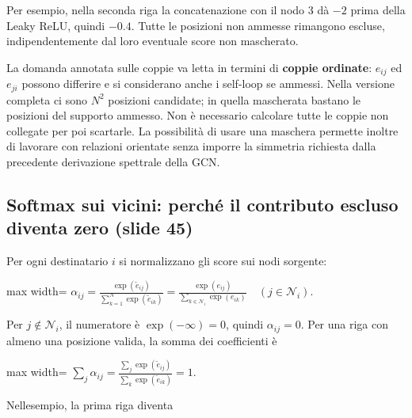 \documentclass[11pt,a4paper,oneside,openany]{book}
\begin{document}
Per esempio, nella seconda riga la concatenazione con il nodo 3 dà \(-2\) prima della Leaky ReLU, quindi \(-0.4\). Tutte le posizioni non ammesse rimangono escluse, indipendentemente dal loro eventuale score non mascherato.

La domanda annotata sulle coppie va letta in termini di \textbf{coppie ordinate}: \(e_{ij}\) ed \(e_{ji}\) possono differire e si considerano anche i self-loop se ammessi. Nella versione completa ci sono \(N^2\) posizioni candidate; in quella mascherata bastano le posizioni del supporto ammesso. Non è necessario calcolare tutte le coppie non collegate per poi scartarle. La possibilità di usare una maschera permette inoltre di lavorare con relazioni orientate senza imporre la simmetria richiesta dalla precedente derivazione spettrale della GCN.

\subsection{Softmax sui vicini: perché il contributo escluso diventa zero (slide 45)}\label{f05-n30-r896}

Per ogni destinatario \(i\) si normalizzano gli score sui nodi sorgente:

\begin{center}
\begin{adjustbox}{max width=\linewidth}
$\displaystyle \boxed{\alpha_{ij}=\frac{\exp(\widetilde e_{ij})}{\sum_{k=1}^N\exp(\widetilde e_{ik})}
=\frac{\exp(e_{ij})}{\sum_{k\in\mathcal N_i}\exp(e_{ik})}
\quad(j\in\mathcal N_i).}$
\end{adjustbox}
\end{center}

Per \(j\notin\mathcal N_i\), il numeratore è \(\exp(-\infty)=0\), quindi \(\alpha_{ij}=0\). Per una riga con almeno una posizione valida, la somma dei coefficienti è

\begin{center}
\begin{adjustbox}{max width=\linewidth}
$\displaystyle \sum_j\alpha_{ij}=\frac{\sum_j\exp(\widetilde e_{ij})}{\sum_k\exp(\widetilde e_{ik})}=1.$
\end{adjustbox}
\end{center}

Nell\textquotesingle esempio, la prima riga diventa
\end{document}
